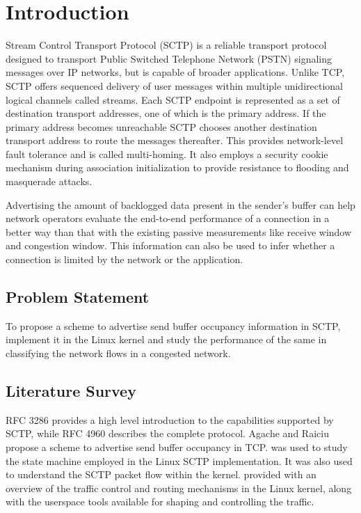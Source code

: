 \chapter{Introduction}
Stream Control Transport Protocol (SCTP) is a reliable transport protocol
designed to transport Public Switched Telephone Network (PSTN) signaling
messages over IP networks, but is capable of broader applications.
Unlike TCP, SCTP offers sequenced delivery of user messages within multiple
unidirectional logical channels called streams.
Each SCTP endpoint is represented as a set of destination transport addresses,
one of which is the primary address. If the primary address becomes unreachable
SCTP chooses another destination transport address to route the messages
thereafter. This provides network-level fault tolerance and is called
multi-homing.
It also employs a security cookie mechanism during association initialization
to provide resistance to flooding and masquerade attacks.

Advertising the amount of backlogged data present in the sender's buffer can
help network operators evaluate the end-to-end performance of a connection
in a better way than that with the existing passive measurements like
receive window and congestion window.
This information can also be used to infer whether a connection is limited
by the network or the application.

\section{Problem Statement}
To propose a scheme to advertise send buffer occupancy information in SCTP,
implement it in the Linux kernel and study the performance of the same in
classifying the network flows in a congested network.

\section{Literature Survey}
RFC 3286 \cite{rfc3286} provides a high level introduction to the capabilities
supported by SCTP, while RFC 4960 \cite{rfc4960} describes the complete
protocol. Agache and Raiciu \cite{tcp-sndbufadv} propose a scheme to advertise
send buffer occupancy in TCP. \cite{budigerelinux} was used to study the state
machine employed in the Linux SCTP implementation. It was also used to
understand the SCTP packet flow within the kernel. \cite{lartc} provided with
an overview of the traffic control and routing mechanisms in the Linux kernel,
along with the userspace tools available for shaping and controlling the
traffic.
